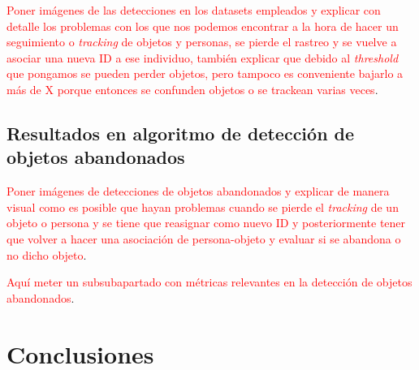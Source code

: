 \textcolor{red}{Poner imágenes de las detecciones en los datasets empleados y explicar con detalle los problemas con los que nos podemos encontrar a la hora de hacer un seguimiento o \textit{tracking} de objetos y personas, se pierde el rastreo y se vuelve a asociar una nueva ID a ese individuo, también explicar que debido al \textit{threshold} que pongamos se pueden perder objetos, pero tampoco es conveniente bajarlo a más de X porque entonces se confunden objetos o se trackean varias veces}.

\newpage

\subsection{Resultados en algoritmo de detección de objetos abandonados}
\label{subsec:resultados-abandon-algorithm}

\textcolor{red}{Poner imágenes de detecciones de objetos abandonados y explicar de manera visual como es posible que hayan problemas cuando se pierde el \textit{tracking} de un objeto o persona y se tiene que reasignar como nuevo ID y posteriormente tener que volver a hacer una asociación de persona-objeto y evaluar si se abandona o no dicho objeto}.

\textcolor{red}{Aquí meter un subsubapartado con métricas relevantes en la detección de objetos abandonados}.

\newpage

\section{Conclusiones}
\label{sec:conclu-resultados}

